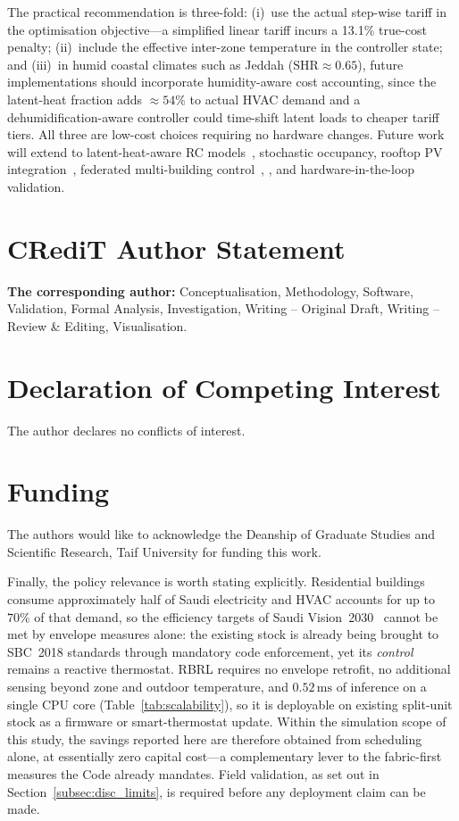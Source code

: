 \documentclass[3p,number]{elsarticle}
\let\oldsection\section
\renewcommand{\section}{\FloatBarrier\oldsection}
\begin{document}
The practical recommendation is three-fold: (i)~use the actual step-wise tariff in the optimisation objective---a simplified linear tariff incurs a 13.1\% true-cost penalty; (ii)~include the effective inter-zone temperature in the controller state; and (iii)~in humid coastal climates such as Jeddah ($\mathrm{SHR}{\approx}0.65$), future implementations should incorporate humidity-aware cost accounting, since the latent-heat fraction adds ${\approx}54\%$ to actual HVAC demand and a dehumidification-aware controller could time-shift latent loads to cheaper tariff tiers.
All three are low-cost choices requiring no hardware changes.
Future work will extend to latent-heat-aware RC models~\cite{Rodrigues2025}, stochastic occupancy, rooftop PV integration~\cite{Alotaibi2024}, federated multi-building control~\cite{Xue2025}, \cite{Yu2021}, and hardware-in-the-loop validation.

\section {CRediT Author Statement}
\textbf{The corresponding author:} Conceptualisation, Methodology, Software,
Validation, Formal Analysis, Investigation, Writing -- Original Draft, Writing
-- Review \& Editing, Visualisation.

\section {Declaration of Competing Interest}
The author declares no conflicts of interest.

\section {Funding}
The authors would like to acknowledge the Deanship of Graduate Studies and Scientific Research, Taif University for funding this work.
 
Finally, the policy relevance is worth stating explicitly. Residential
buildings consume approximately half of Saudi electricity and HVAC accounts for
up to $70\%$ of that demand, so the efficiency targets of Saudi
Vision~2030~\cite{Belaid2025} cannot be met by envelope measures alone: the
existing stock is already being brought to SBC~2018 standards through mandatory
code enforcement, yet its \emph{control} remains a reactive thermostat. RBRL
requires no envelope retrofit, no additional sensing beyond zone and outdoor
temperature, and $0.52\,\text{ms}$ of inference on a single CPU core
(Table~\ref{tab:scalability}), so it is deployable on existing split-unit stock
as a firmware or smart-thermostat update. Within the simulation scope of this
study, the savings reported here are therefore obtained from scheduling alone,
at essentially zero capital cost---a complementary lever to the fabric-first
measures the Code already mandates. Field validation, as set out in
Section~\ref{subsec:disc_limits}, is required before any deployment claim can be
made.
\end{document}

